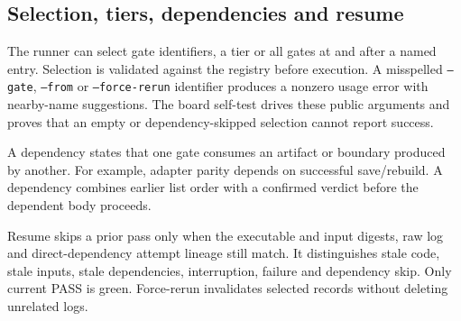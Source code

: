 \documentclass[10pt,aps,prd,twocolumn,nofootinbib]{revtex4-2}
\newcommand{\code}[1]{\texttt{#1}}
\begin{document}
\subsection{Selection, tiers, dependencies and resume}

The runner can select gate identifiers, a tier or all gates at and after a
named entry.  Selection is validated against the registry before execution.
A misspelled \code{--gate}, \code{--from} or \code{--force-rerun}
identifier produces a nonzero usage error with nearby-name suggestions.  The
board self-test drives these public arguments and proves that an empty or
dependency-skipped selection cannot report success.

A dependency states that one gate consumes an artifact or boundary produced
by another.  For example, adapter parity depends on successful save/rebuild.
A dependency combines earlier list order with a confirmed verdict before the
dependent body proceeds.

Resume skips a prior pass only when the executable and input digests, raw log
and direct-dependency attempt lineage still match.  It distinguishes stale
code, stale inputs, stale dependencies, interruption, failure and dependency
skip.  Only current PASS is green.  Force-rerun invalidates selected records
without deleting unrelated logs.
\end{document}
